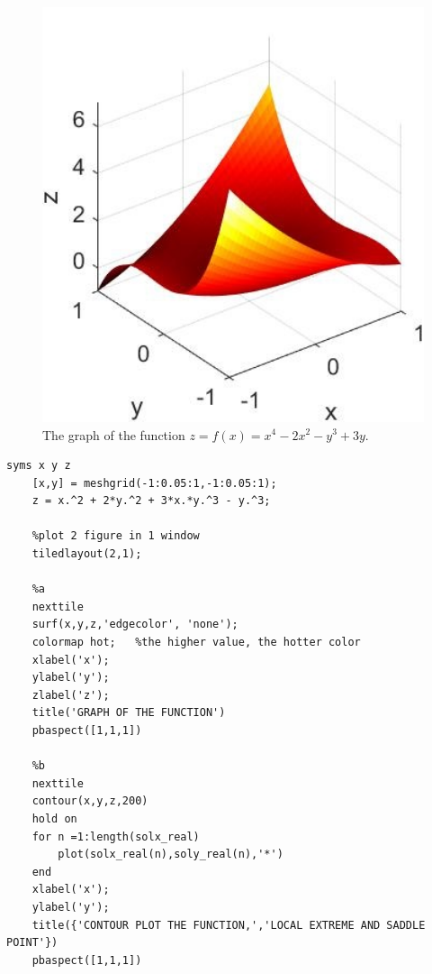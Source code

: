 \begin{figure}[H]
  \centering
  \includegraphics[width=12cm]{graphics/1a.jpg}
  \caption{The graph of the function $ z = f(x) = x^4 - 2x^2 - y^3 + 3y $.}
\end{figure}

\begin{lstlisting}[style=Matlab-editor]
    syms x y z
    [x,y] = meshgrid(-1:0.05:1,-1:0.05:1);
    z = x.^2 + 2*y.^2 + 3*x.*y.^3 - y.^3;

    %plot 2 figure in 1 window
    tiledlayout(2,1);

    %a
    nexttile
    surf(x,y,z,'edgecolor', 'none');
    colormap hot;   %the higher value, the hotter color
    xlabel('x');
    ylabel('y');
    zlabel('z');
    title('GRAPH OF THE FUNCTION')
    pbaspect([1,1,1])

    %b
    nexttile
    contour(x,y,z,200)
    hold on
    for n =1:length(solx_real)
        plot(solx_real(n),soly_real(n),'*')
    end
    xlabel('x');
    ylabel('y');
    title({'CONTOUR PLOT THE FUNCTION,','LOCAL EXTREME AND SADDLE POINT'})
    pbaspect([1,1,1])
\end{lstlisting}

